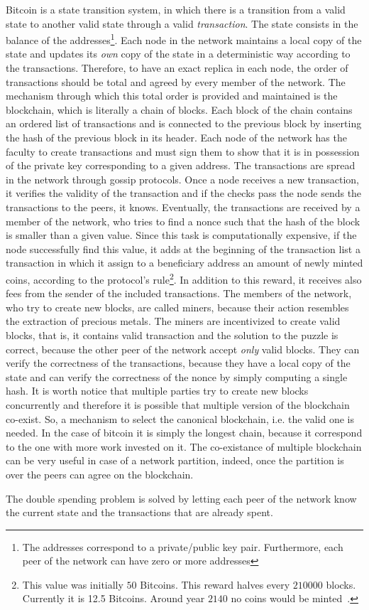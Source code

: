Bitcoin is a state transition system, in which there is a transition from
a valid state to another valid state through a valid \emph{transaction}. The
state consists in the balance of the addresses\footnote{The addresses 
correspond to a private/public key pair. Furthermore, each peer of the 
network can have zero or more addresses}. Each node in the network maintains a
local copy of the state and updates its \emph{own} copy of the state in a 
deterministic way according to the transactions. Therefore, to have an exact 
replica in each node, the order of transactions should be total and agreed by 
every member of the network. The mechanism through which this total order is
provided and maintained is the blockchain, which is literally a chain of
blocks. Each block of the chain contains an ordered list of transactions and is 
connected to the previous block by inserting the hash of the previous block in 
its header. Each node of the network has the faculty to create transactions and
must sign them to show that it is in possession of the private key corresponding
to a given address. The transactions are spread in the network through
gossip protocols. Once a node receives a new transaction, it verifies 
the validity of the transaction and if the checks pass the node sends the 
transactions to the peers, it knows. Eventually, the transactions are received
by a member of the network, who tries to find a nonce such that the hash of the 
block is smaller than a given value. Since this task is computationally 
expensive, if the node successfully find this value, it adds at the beginning 
of the transaction list a transaction in which it assign to a beneficiary 
address an amount of newly minted coins, according to the protocol's 
rule\footnote{This value was initially $50$ Bitcoins. This reward halves every 
$210000$ blocks. Currently it is 12.5 Bitcoins. Around year $2140$ no coins 
would be minted~\cite{bib:masteringbitcoin}.}. In addition to this reward, it 
receives also fees from the sender of the included transactions. The members of
the network, who try to create new blocks, are called miners, because their 
action resembles the extraction of precious metals. The miners are incentivized 
to create valid blocks, that is, it contains valid transaction and the solution 
to the puzzle  is correct, because the other peer of the network accept 
\emph{only} valid blocks. They can verify the correctness of the transactions, 
because they have a local copy of the state and can verify the correctness of 
the nonce by simply computing a single hash. It is worth notice that multiple
parties try to create new blocks concurrently and therefore it is possible that 
multiple version of the blockchain co-exist. So, a mechanism to select the 
canonical blockchain, i.e. the valid one is needed. In the case of bitcoin
it is simply the longest chain, because it correspond to the one with more work
invested on it. The co-existance of multiple blockchain can be very useful
in case of a network partition, indeed, once the partition is over the 
peers can agree on the blockchain.

The double spending problem is solved by letting each peer of the network
know the current state and the transactions that are already spent.











